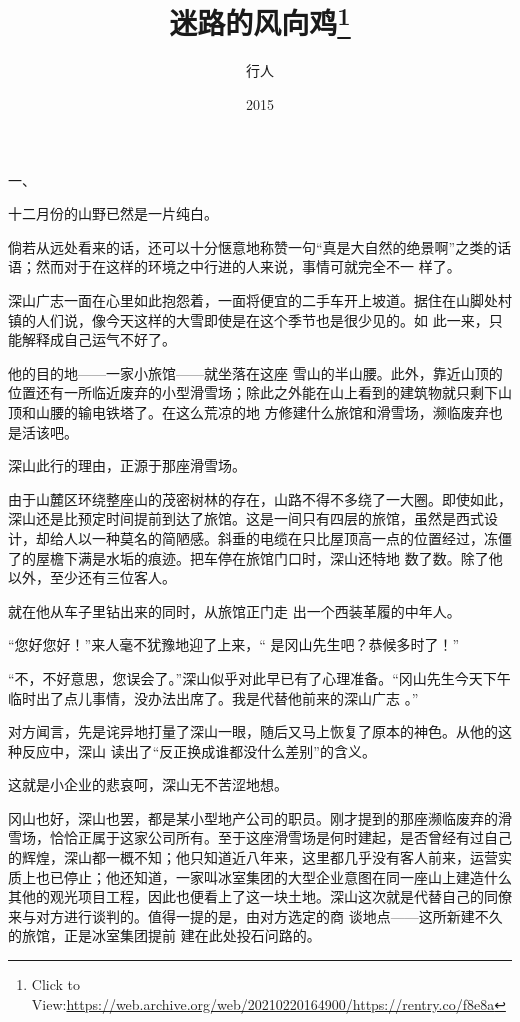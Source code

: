 \documentclass{article}
\title{迷路的风向鸡\footnote{Click to View:\url{https://web.archive.org/web/20210220164900/https://rentry.co/f8e8a}}}
\author{行人}
\date{2015}
\begin{document}

\maketitle


\Large


﻿一、 


十二月份的山野已然是一片纯白。 

倘若从远处看来的话，还可以十分惬意地称赞一句“真是大自然的绝景啊”之类的话语；然而对于在这样的环境之中行进的人来说，事情可就完全不一
样了。 

深山广志一面在心里如此抱怨着，一面将便宜的二手车开上坡道。据住在山脚处村镇的人们说，像今天这样的大雪即使是在这个季节也是很少见的。如
此一来，只能解释成自己运气不好了。 

他的目的地——一家小旅馆——就坐落在这座
\newpage
雪山的半山腰。此外，靠近山顶的位置还有一所临近废弃的小型滑雪场；除此之外能在山上看到的建筑物就只剩下山顶和山腰的输电铁塔了。在这么荒凉的地
方修建什么旅馆和滑雪场，濒临废弃也是活该吧。 


深山此行的理由，正源于那座滑雪场。 

由于山麓区环绕整座山的茂密树林的存在，山路不得不多绕了一大圈。即使如此，深山还是比预定时间提前到达了旅馆。这是一间只有四层的旅馆，虽然是西式设计，却给人以一种莫名的简陋感。斜垂的电缆在只比屋顶高一点的位置经过，冻僵了的屋檐下满是水垢的痕迹。把车停在旅馆门口时，深山还特地
数了数。除了他以外，至少还有三位客人。 

就在他从车子里钻出来的同时，从旅馆正门走
出一个西装革履的中年人。 

“您好您好！”来人毫不犹豫地迎了上来，“
是冈山先生吧？恭候多时了！” 

\newpage

“不，不好意思，您误会了。”深山似乎对此早已有了心理准备。“冈山先生今天下午临时出了点儿事情，没办法出席了。我是代替他前来的深山广志
。” 

对方闻言，先是诧异地打量了深山一眼，随后又马上恢复了原本的神色。从他的这种反应中，深山
读出了“反正换成谁都没什么差别”的含义。 

这就是小企业的悲哀呵，深山无不苦涩地想。
 

冈山也好，深山也罢，都是某小型地产公司的职员。刚才提到的那座濒临废弃的滑雪场，恰恰正属于这家公司所有。至于这座滑雪场是何时建起，是否曾经有过自己的辉煌，深山都一概不知；他只知道近八年来，这里都几乎没有客人前来，运营实质上也已停止；他还知道，一家叫冰室集团的大型企业意图在同一座山上建造什么其他的观光项目工程，因此也便看上了这一块土地。深山这次就是代替自己的同僚来与对方进行谈判的。值得一提的是，由对方选定的商
\newpage
谈地点——这所新建不久的旅馆，正是冰室集团提前
建在此处投石问路的。 
\end{document}
